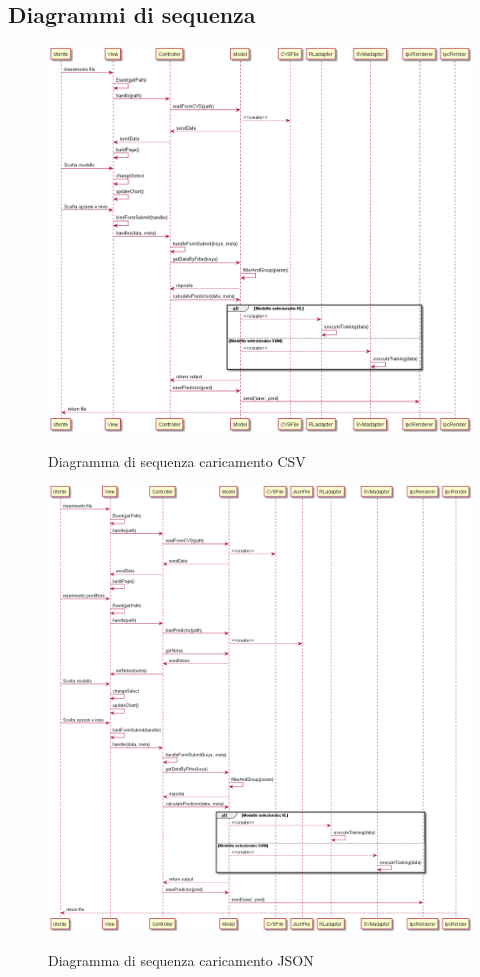 \documentclass[../specifica-tecnica.tex]{subfiles}
\begin{document}
\newpage

\subsection{Diagrammi di sequenza}
\begin{figure}[H]
  \begin{center}
    \includegraphics[width=18cm]{../../diagrammi/diagrammi-training-app/out/sequenceDiagram.png}\\
    \caption{Diagramma di sequenza caricamento CSV}%
  \end{center}
\end{figure}

\newpage

\begin{figure}[H]
  \begin{center}
    \includegraphics[width=18cm]{../../diagrammi/diagrammi-training-app/out/sequenceDiagram2.png}\\
    \caption{Diagramma di sequenza caricamento JSON}%
  \end{center}
\end{figure}
\end{document}

